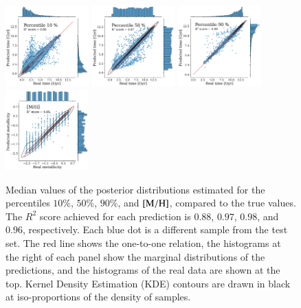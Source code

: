 \begin{figure}[h!]
    \centering
    
    \includegraphics[width=0.285\textwidth]{images/posterior/sns_mean_true_0.pdf}
    \includegraphics[width=0.285\textwidth]{images/posterior/sns_mean_true_4.pdf}
    \includegraphics[width=0.285\textwidth]{images/posterior/sns_mean_true_8.pdf}
    \includegraphics[width=0.285\textwidth]{images/posterior/sns_mean_true_9.pdf}
    
    \caption{Median values of the posterior distributions estimated for the percentiles $10\%$, $50\%$, $90\%$, and $\rm{[M/H]}$, compared to the true values. The $R^2$ score achieved for each prediction is $0.88$, $0.97$, $0.98$, and $0.96$, respectively. Each blue dot is a different sample from the test set. The red line shows the one-to-one relation, the histograms at the right of each panel show the marginal distributions of the predictions, and the histograms of the real data are shown at the top. Kernel Density Estimation (KDE)  contours are drawn in black at iso-proportions of the density of samples.}
    \label{meanvstrue}
\end{figure}



